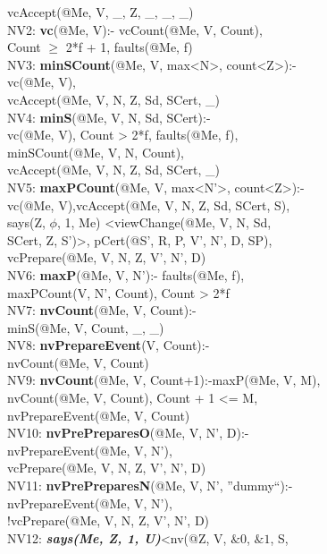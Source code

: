 \begin{code}
\> vcAccept(@Me, V, \_, Z, \_, \_, \_)\\
NV2: \textbf{vc}(@Me, V):- vcCount(@Me, V, Count),\\
\> Count $\geq$ 2*f + 1, faults(@Me, f)\\
NV3: \textbf{minSCount}(@Me, V, max<N>, count<Z>):- \\
\> vc(@Me, V),\\
\> vcAccept(@Me, V, N, Z, Sd, SCert, \_)\\
NV4: \textbf{minS}(@Me, V, N, Sd, SCert):- \\
\> vc(@Me, V), Count > 2*f, faults(@Me, f),\\
\> minSCount(@Me, V, N, Count), \\
\> vcAccept(@Me, V, N, Z, Sd, SCert, \_)\\
NV5: \textbf{maxPCount}(@Me, V, max<N'>, count<Z>):- \\
\> vc(@Me, V),vcAccept(@Me, V, N, Z, Sd, SCert, S),\\
\> says(Z, $\phi$, 1, Me) <viewChange(@Me, V, N, Sd, \\
\> SCert, Z, S')>, pCert(@S', R, P, V', N', D, SP),\\
\> vcPrepare(@Me, V, N, Z, V', N', D)\\
NV6: \textbf{maxP}(@Me, V, N'):- faults(@Me, f),\\
\> maxPCount(V, N', Count), Count > 2*f \\
NV7: \textbf{nvCount}(@Me, V, Count):-\\
\> minS(@Me, V, Count, \_, \_)\\
NV8: \textbf{nvPrepareEvent}(V, Count):-\\
\> nvCount(@Me, V, Count)\\
NV9: \textbf{nvCount}(@Me, V, Count+1):-maxP(@Me, V, M), \\
\> nvCount(@Me, V, Count), Count + 1 <= M, \\
\> nvPrepareEvent(@Me, V, Count)\\
NV10: \textbf{nvPrePreparesO}(@Me, V, N', D):-\\
\> nvPrepareEvent(@Me, V, N'), \\
\> vcPrepare(@Me, V, N, Z, V', N', D)\\
NV11: \textbf{nvPrePreparesN}(@Me, V, N', ''dummy``):-\\
\> nvPrepareEvent(@Me, V, N'), \\
\> !vcPrepare(@Me, V, N, Z, V', N', D)\\
NV12: \textbf{\textit{says(Me, Z, 1, U)}}<nv(@Z, V, $\&0$, $\&1$, S, \\

\end{code}
